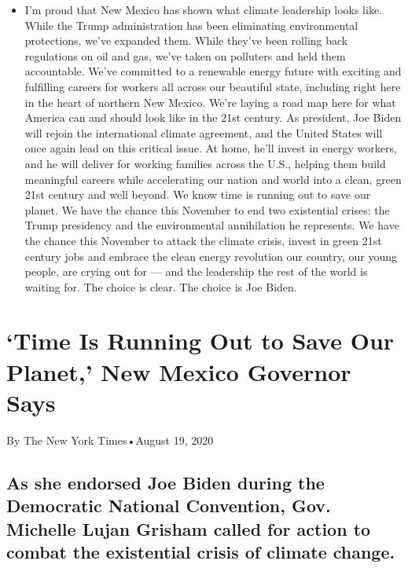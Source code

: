\begin{itemize}
\tightlist
\item
  I'm proud that New Mexico has shown what climate leadership looks
  like. While the Trump administration has been eliminating
  environmental protections, we've expanded them. While they've been
  rolling back regulations on oil and gas, we've taken on polluters and
  held them accountable. We've committed to a renewable energy future
  with exciting and fulfilling careers for workers all across our
  beautiful state, including right here in the heart of northern New
  Mexico. We're laying a road map here for what America can and should
  look like in the 21st century. As president, Joe Biden will rejoin the
  international climate agreement, and the United States will once again
  lead on this critical issue. At home, he'll invest in energy workers,
  and he will deliver for working families across the U.S., helping them
  build meaningful careers while accelerating our nation and world into
  a clean, green 21st century and well beyond. We know time is running
  out to save our planet. We have the chance this November to end two
  existential crises: the Trump presidency and the environmental
  annihilation he represents. We have the chance this November to attack
  the climate crisis, invest in green 21st century jobs and embrace the
  clean energy revolution our country, our young people, are crying out
  for --- and the leadership the rest of the world is waiting for. The
  choice is clear. The choice is Joe Biden.
\end{itemize}

\hypertarget{time-is-running-out-to-save-our-planet-new-mexico-governor-says-1}{%
\section{`Time Is Running Out to Save Our Planet,' New Mexico Governor
Says}\label{time-is-running-out-to-save-our-planet-new-mexico-governor-says-1}}

By The New York Times•August 19, 2020

\hypertarget{as-she-endorsed-joe-biden-during-the-democratic-national-convention-gov-michelle-lujan-grisham-called-for-action-to-combat-the-existential-crisis-of-climate-change-1}{%
\subsection{As she endorsed Joe Biden during the Democratic National
Convention, Gov. Michelle Lujan Grisham called for action to combat the
existential crisis of climate
change.}\label{as-she-endorsed-joe-biden-during-the-democratic-national-convention-gov-michelle-lujan-grisham-called-for-action-to-combat-the-existential-crisis-of-climate-change-1}}

